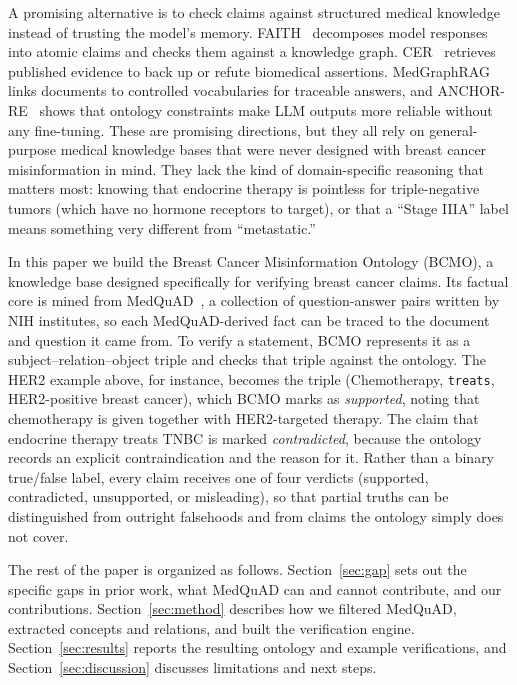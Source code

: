 \documentclass[10pt,a4paper]{article}
\begin{document}
A promising alternative is to check claims against structured medical knowledge instead of trusting the model's memory. FAITH~\cite{zhou2026faith} decomposes model responses into atomic claims and checks them against a knowledge graph. CER~\cite{barone2025cer} retrieves published evidence to back up or refute biomedical assertions. MedGraphRAG~\cite{wu2024medgraphrag} links documents to controlled vocabularies for traceable answers, and ANCHOR-RE~\cite{ming2026anchor} shows that ontology constraints make LLM outputs more reliable without any fine-tuning. These are promising directions, but they all rely on general-purpose medical knowledge bases that were never designed with breast cancer misinformation in mind. They lack the kind of domain-specific reasoning that matters most: knowing that endocrine therapy is pointless for triple-negative tumors (which have no hormone receptors to target), or that a ``Stage IIIA'' label means something very different from ``metastatic.''

In this paper we build the Breast Cancer Misinformation Ontology (BCMO), a knowledge base designed specifically for verifying breast cancer claims. Its factual core is mined from MedQuAD~\cite{benabacha2019}, a collection of question-answer pairs written by NIH institutes, so each MedQuAD-derived fact can be traced to the document and question it came from. To verify a statement, BCMO represents it as a subject--relation--object triple and checks that triple against the ontology. The HER2 example above, for instance, becomes the triple (Chemotherapy, \texttt{treats}, HER2-positive breast cancer), which BCMO marks as \emph{supported}, noting that chemotherapy is given together with HER2-targeted therapy. The claim that endocrine therapy treats TNBC is marked \emph{contradicted}, because the ontology records an explicit contraindication and the reason for it. Rather than a binary true/false label, every claim receives one of four verdicts (supported, contradicted, unsupported, or misleading), so that partial truths can be distinguished from outright falsehoods and from claims the ontology simply does not cover.

The rest of the paper is organized as follows. Section~\ref{sec:gap} sets out the specific gaps in prior work, what MedQuAD can and cannot contribute, and our contributions. Section~\ref{sec:method} describes how we filtered MedQuAD, extracted concepts and relations, and built the verification engine. Section~\ref{sec:results} reports the resulting ontology and example verifications, and Section~\ref{sec:discussion} discusses limitations and next steps.
\end{document}
